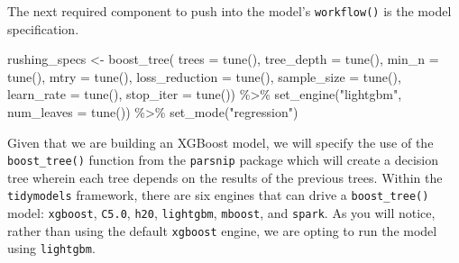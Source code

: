 \documentclass[
  letterpaper,
]{krantz}
\newenvironment{Shaded}{\begin{snugshade}}{\end{snugshade}}
\newcommand{\AttributeTok}[1]{\textcolor[rgb]{0.40,0.45,0.13}{#1}}
\newcommand{\FunctionTok}[1]{\textcolor[rgb]{0.28,0.35,0.67}{#1}}
\newcommand{\NormalTok}[1]{\textcolor[rgb]{0.00,0.23,0.31}{#1}}
\newcommand{\OtherTok}[1]{\textcolor[rgb]{0.00,0.23,0.31}{#1}}
\newcommand{\SpecialCharTok}[1]{\textcolor[rgb]{0.37,0.37,0.37}{#1}}
\newcommand{\StringTok}[1]{\textcolor[rgb]{0.13,0.47,0.30}{#1}}
\begin{document}
The next required component to push into the model's \texttt{workflow()}
is the model specification.

\begin{Shaded}
\begin{Highlighting}[]
\NormalTok{rushing\_specs }\OtherTok{\textless{}{-}} \FunctionTok{boost\_tree}\NormalTok{(}
  \AttributeTok{trees =} \FunctionTok{tune}\NormalTok{(),}
  \AttributeTok{tree\_depth =} \FunctionTok{tune}\NormalTok{(), }
  \AttributeTok{min\_n =} \FunctionTok{tune}\NormalTok{(),}
  \AttributeTok{mtry =} \FunctionTok{tune}\NormalTok{(),}
  \AttributeTok{loss\_reduction =} \FunctionTok{tune}\NormalTok{(),}
  \AttributeTok{sample\_size =} \FunctionTok{tune}\NormalTok{(),}
  \AttributeTok{learn\_rate =} \FunctionTok{tune}\NormalTok{(),}
  \AttributeTok{stop\_iter =} \FunctionTok{tune}\NormalTok{()) }\SpecialCharTok{\%\textgreater{}\%}
  \FunctionTok{set\_engine}\NormalTok{(}\StringTok{"lightgbm"}\NormalTok{, }\AttributeTok{num\_leaves =} \FunctionTok{tune}\NormalTok{()) }\SpecialCharTok{\%\textgreater{}\%}
  \FunctionTok{set\_mode}\NormalTok{(}\StringTok{"regression"}\NormalTok{)}
\end{Highlighting}
\end{Shaded}

Given that we are building an XGBoost model, we will specify the use of
the \texttt{boost\_tree()} function from the \texttt{parsnip} package
which will create a decision tree wherein each tree depends on the
results of the previous trees. Within the \texttt{tidymodels} framework,
there are six engines that can drive a \texttt{boost\_tree()} model:
\texttt{xgboost}, \texttt{C5.0}, \texttt{h20}, \texttt{lightgbm},
\texttt{mboost}, and \texttt{spark}. As you will notice, rather than
using the default \texttt{xgboost} engine, we are opting to run the
model using \texttt{lightgbm}.
\end{document}
